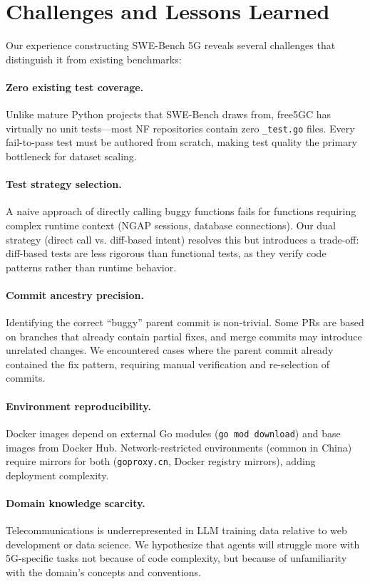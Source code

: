 \documentclass{article}
\begin{document}
\section{Challenges and Lessons Learned}

Our experience constructing SWE-Bench 5G reveals several challenges that distinguish it from existing benchmarks:

\paragraph{Zero existing test coverage.} Unlike mature Python projects that SWE-Bench draws from, free5GC has virtually no unit tests---most NF repositories contain zero \texttt{\_test.go} files. Every fail-to-pass test must be authored from scratch, making test quality the primary bottleneck for dataset scaling.

\paragraph{Test strategy selection.} A naive approach of directly calling buggy functions fails for functions requiring complex runtime context (NGAP sessions, database connections). Our dual strategy (direct call vs. diff-based intent) resolves this but introduces a trade-off: diff-based tests are less rigorous than functional tests, as they verify code patterns rather than runtime behavior.

\paragraph{Commit ancestry precision.} Identifying the correct ``buggy'' parent commit is non-trivial. Some PRs are based on branches that already contain partial fixes, and merge commits may introduce unrelated changes. We encountered cases where the parent commit already contained the fix pattern, requiring manual verification and re-selection of commits.

\paragraph{Environment reproducibility.} Docker images depend on external Go modules (\texttt{go mod download}) and base images from Docker Hub. Network-restricted environments (common in China) require mirrors for both (\texttt{goproxy.cn}, Docker registry mirrors), adding deployment complexity.

\paragraph{Domain knowledge scarcity.} Telecommunications is underrepresented in LLM training data relative to web development or data science. We hypothesize that agents will struggle more with 5G-specific tasks not because of code complexity, but because of unfamiliarity with the domain's concepts and conventions.
\end{document}

